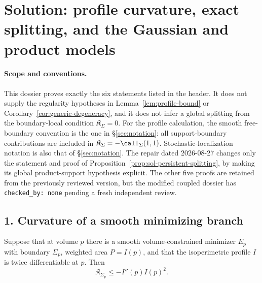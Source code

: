 \documentclass[../main.tex]{subfiles}
\begin{document}
%
\section*{Solution: profile curvature, exact splitting, and the Gaussian and product models}
\label{sec:sol-kls-geometry-models}

\paragraph{Scope and conventions.}
This dossier proves exactly the six statements listed in the header.  It does not supply the
regularity hypotheses in Lemma~\ref{lem:profile-bound} or
Corollary~\ref{cor:generic-degeneracy}, and it does not infer a global splitting from the
boundary-local condition $\mathfrak K_\Sigma=0$.  For the profile calculation, the smooth
free-boundary convention is the one in \S\ref{sec:notation}: all support-boundary contributions
are included in $\mathfrak K_\Sigma=-\calI_\Sigma(1,1)$.  Stochastic-localization notation is
also that of \S\ref{sec:notation}.  The repair dated 2026-08-27 changes only the statement and
proof of Proposition~\ref{prop:sol-persistent-splitting}, by making its global product-support
hypothesis explicit.  The other five proofs are retained from the previously reviewed version,
but the modified coupled dossier has \texttt{checked\_by: none} pending a fresh independent
review.

\subsection*{1. Curvature of a smooth minimizing branch}

\begin{lemma}[= Lemma~\ref{lem:profile-bound}]
\label{lem:sol-profile-bound}
Suppose that at volume $p$ there is a smooth volume-constrained minimizer $E_p$ with boundary
$\Sigma_p$, weighted area $P=I(p)$, and that the isoperimetric profile $I$ is twice
differentiable at $p$.  Then
\[
  \mathfrak K_{\Sigma_p}\le -I''(p)I(p)^2.
\]
\end{lemma}
\end{document}
